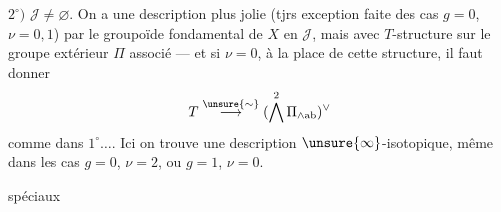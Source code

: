 $2^\circ)$ $\mathcal J\ne\varnothing$. On a une description
plus jolie (tjrs exception faite
des cas $g=0$, $\nu=0,1$) par le
groupoïde fondamental de $X$
en $\mathcal J$, mais avec $T$-structure
 sur le groupe extérieur
$\Pi$ associé --- et si $\nu=0$, à la place de
cette structure, il faut donner
\[
T\overset{\unsure{\sim}}{\longrightarrow}
(\bigwedge^2\Pi_{\wedge\mathrm{ab}})^\vee
\]
comme dans $1^\circ\ldots$. Ici on trouve
une description $\unsure{\infty}$-isotopique, même
dans les cas $g=0$, $\nu=2$, ou $g=1$, $\nu=0$.

 
spéciaux


